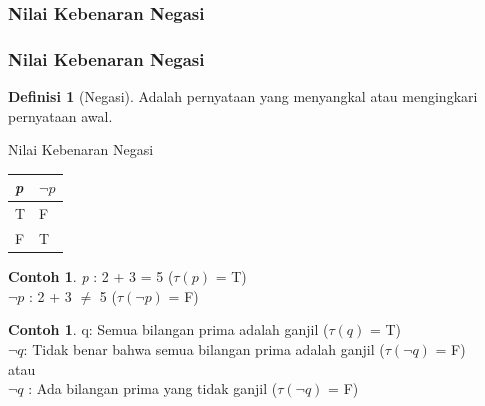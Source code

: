 \documentclass[handout]{beamer}
\theoremstyle{definition}
\newtheorem{definisi}[theorem]{Definisi}
\theoremstyle{example}
\newtheorem{contoh}[theorem]{Contoh}
\begin{document}
\subsubsection{Nilai Kebenaran Negasi}
\begin{frame}[shrink]
	\frametitle{Nilai Kebenaran Negasi}
	\begin{definisi}[Negasi]
		Adalah pernyataan yang menyangkal atau mengingkari pernyataan awal.		   	
	\end{definisi}
	\begin{block}{Nilai Kebenaran Negasi}
		\begin{tabular}{ | l | l | }
			\hline
			\textit{p} & $\neg\textit{p}$  \\ \hline
			T & F  \\ \hline			
			F & T  \\     		 
			\hline
		\end{tabular}
	\end{block}
	\begin{contoh}
		 \textit{p}  : 2 + 3 = 5 ($\tau(\textit{p})$ = T)\\
		 $\neg\textit{p}$ : 2 + 3 $\neq$ 5 ($\tau(\neg\textit{p})$ = F)		 
	\end{contoh}
	\begin{contoh}
	 q: Semua bilangan prima adalah ganjil ($\tau(\textit{q})$ = T) \\
	$\neg\textit{q}$: Tidak benar bahwa semua bilangan prima adalah ganjil ($\tau(\neg\textit{q})$ = F)\\
	atau\\
	$\neg\textit{q}$ 	: Ada bilangan prima yang tidak ganjil ($\tau(\neg\textit{q})$ = F)	 
	\end{contoh}
\end{frame}
\end{document}
